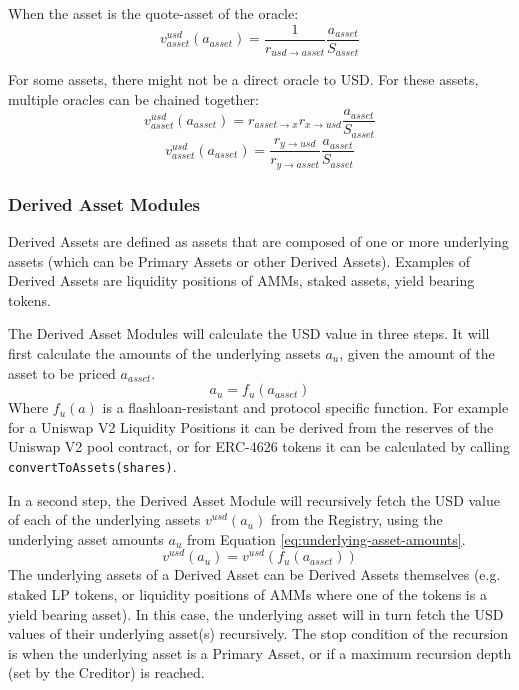 \documentclass[sigconf,nonacm]{acmart}
\begin{document}
When the asset is the quote-asset of the oracle:
\begin{equation}
    v^{usd}_{asset}(a_{asset}) = \frac{1}{r_{usd\rightarrow asset}} \frac{a_{asset}}{S_{asset}}
\end{equation}

For some assets, there might not be a direct oracle to USD.
For these assets, multiple oracles can be chained together:
\begin{equation}
    v^{usd}_{asset}(a_{asset}) = r_{asset\rightarrow x} r_{x\rightarrow usd} \frac{a_{asset}}{S_{asset}}
\end{equation}
\begin{equation}
    v^{usd}_{asset}(a_{asset}) = \frac{r_{y\rightarrow usd}}{r_{y\rightarrow asset}} \frac{a_{asset}}{S_{asset}}
\end{equation}

\subsubsection{Derived Asset Modules}
Derived Assets are defined as assets that are composed of one or more underlying assets (which can be Primary Assets or other Derived Assets).
Examples of Derived Assets are liquidity positions of AMMs, staked assets, yield bearing tokens.

The Derived Asset Modules will calculate the USD value in three steps.
It will first calculate the amounts of the underlying assets $a_{u}$, given the amount of the asset to be priced $a_{asset}$.
\begin{equation}
    \label{eq:underlying-asset-amounts}
    a_{u} = f_{u}(a_{asset})
\end{equation}
Where $f_{u}(a)$ is a flashloan-resistant and protocol specific function.
For example for a Uniswap V2 Liquidity Positions it can be derived from the reserves of the Uniswap V2 pool contract,
or for ERC-4626 tokens it can be calculated by calling \texttt{convertToAssets(shares)}.

In a second step, the Derived Asset Module will recursively fetch the USD value of each of the underlying assets $v^{usd}(a_{u})$ from the Registry,
using the underlying asset amounts $a_{u}$ from Equation \ref{eq:underlying-asset-amounts}.
\begin{equation}
    v^{usd}(a_{u}) = v^{usd}(f_{u}(a_{asset}))
\end{equation}
The underlying assets of a Derived Asset can be Derived Assets themselves (e.g. staked LP tokens, or liquidity positions of AMMs where one of the tokens is a yield bearing asset).
In this case, the underlying asset will in turn fetch the USD values  of their underlying asset(s) recursively.
The stop condition of the recursion is when the underlying asset is a Primary Asset, or if a maximum recursion depth (set by the Creditor) is reached.
\end{document}
